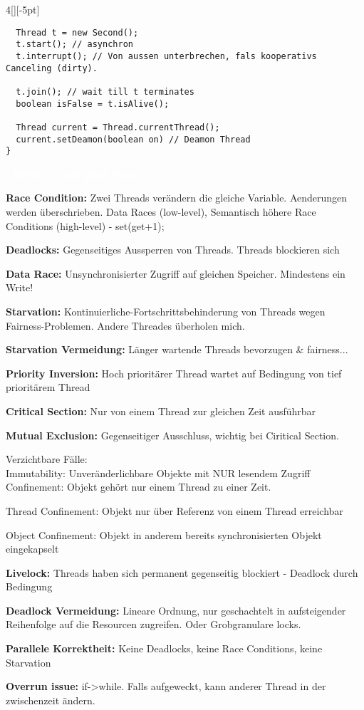 \documentclass[%
	pdftex,%
	a4paper,%
	landscape,%
	ngerman,
	oneside,%
	6pt,%
	halfparskip,%
]{scrbook}
\newenvironment{mainbox}{%
  \def\FrameCommand{\fboxrule 1px \fcolorbox{black}{spec_blue}}%
  \MakeFramed {\advance\hsize-\width \FrameRestore}}%
 {\endMakeFramed}
\newcommand{\maintopic}[1]{\setcounter{subtopicenum}{0}\setcounter{subsubtopicenum}{0}\vspace{-4px}\begin{mainbox}\textcolor{white}{\textbf{\large{\stepcounter{maintopicenum}\Roman{maintopicenum}. #1}}}\end{mainbox}\vspace{-4px}}
\newenvironment{tight-itemize}
{ \begin{itemize}
    \setlength{\itemsep}{0px}
    \setlength{\parskip}{0px}
    \setlength{\parsep}{0px}  }
{ \end{itemize}                  }
\begin{document}
\begin{multicols}{4}[][-5pt]
\begin{lstlisting}
  Thread t = new Second();
  t.start(); // asynchron
  t.interrupt(); // Von aussen unterbrechen, fals kooperativs Canceling (dirty).
  
  t.join(); // wait till t terminates
  boolean isFalse = t.isAlive();

  Thread current = Thread.currentThread();
  current.setDeamon(boolean on) // Deamon Thread
}
\end{lstlisting}
\maintopic{Failures - not good topic}
\begin{tight-itemize}
	\item{\textbf{Race Condition:} Zwei Threads verändern die gleiche Variable. Aenderungen werden überschrieben. Data Races (low-level), Semantisch höhere Race Conditions (high-level) - set(get+1);}
	\item{\textbf{Deadlocks:} Gegenseitiges Aussperren von Threads. Threads blockieren sich}
	\item{\textbf{Data Race:} Unsynchronisierter Zugriff auf gleichen Speicher. Mindestens ein Write!}
	\item{\textbf{Starvation:} Kontinuierliche-Fortschrittsbehinderung von Threads wegen Fairness-Problemen. Andere Threades überholen mich.}
	\item{\textbf{Starvation Vermeidung:} Länger wartende Threads bevorzugen \& fairness...}
	\item{\textbf{Priority Inversion:} Hoch prioritärer Thread wartet auf Bedingung von tief prioritärem Thread}
	\item{\textbf{Critical Section:} Nur von einem Thread zur gleichen Zeit ausführbar}
	\item{\textbf{Mutual Exclusion:} Gegenseitiger Ausschluss, wichtig bei Ciritical Section.}
	\item{Verzichtbare Fälle: \\
	Immutability: Unveränderlichbare Objekte mit NUR lesendem Zugriff \\
	Confinement: Objekt gehört nur einem Thread zu einer Zeit.}
	\item{Thread Confinement: Objekt nur über Referenz von einem Thread erreichbar}
	\item{Object Confinement: Objekt in anderem bereits synchronisierten Objekt eingekapselt}
	\item{\textbf{Livelock:} Threads haben sich permanent gegenseitig blockiert - Deadlock durch Bedingung}
	\item{\textbf{Deadlock Vermeidung:} Lineare Ordnung, nur geschachtelt in aufsteigender Reihenfolge auf die Resourcen zugreifen. Oder Grobgranulare locks.}
	\item{\textbf{Parallele Korrektheit:} Keine Deadlocks, keine Race Conditions, keine Starvation}
	\item{\textbf{Overrun issue:} if->while. Falls aufgeweckt, kann anderer Thread in der zwischenzeit ändern.}
\end{tight-itemize}


\end{multicols}
\end{document}

